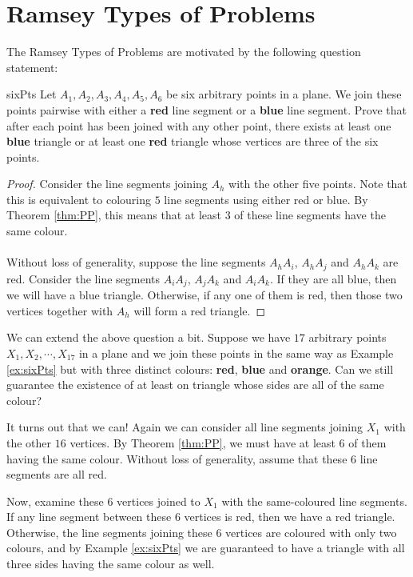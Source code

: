 \documentclass[math]{amznotes}
\theoremstyle{remark}
\begin{document}
\section{Ramsey Types of Problems}
The Ramsey Types of Problems are motivated by the following question statement:
\begin{exbox}{}{sixPts}
    Let $A_1, A_2, A_3, A_4, A_5, A_6$ be six arbitrary points in a plane. We join these points pairwise with either a {\color{red} \textbf{red}} line segment or a {\color{blue} \textbf{blue}} line segment. Prove that after each point has been joined with any other point, there exists at least one {\color{blue} \textbf{blue}} triangle or at least one {\color{red} \textbf{red}} triangle whose vertices are three of the six points.
    \tcblower   
    \begin{proof}
        Consider the line segments joining $A_h$ with the other five points. Note that this is equivalent to colouring $5$ line segments using either red or blue. By Theorem \ref{thm:PP}, this means that at least $3$ of these line segments have the same colour.
        \\\\
        Without loss of generality, suppose the line segments $A_hA_i$, $A_hA_j$ and $A_hA_k$ are red. Consider the line segments $A_iA_j$, $A_jA_k$ and $A_iA_k$. If they are all blue, then we will have a blue triangle. Otherwise, if any one of them is red, then those two vertices together with $A_h$ will form a red triangle.
    \end{proof}
\end{exbox}
We can extend the above question a bit. Suppose we have $17$ arbitrary points $X_1, X_2, \cdots, X_{17}$ in a plane and we join these points in the same way as Example \ref{ex:sixPts} but with three distinct colours: {\color{red} \textbf{red}}, {\color{blue} \textbf{blue}} and {\color{orange} \textbf{orange}}. Can we still guarantee the existence of at least on triangle whose sides are all of the same colour?

It turns out that we can! Again we can consider all line segments joining $X_1$ with the other $16$ vertices. By Theorem \ref{thm:PP}, we must have at least $6$ of them having the same colour. Without loss of generality, assume that these $6$ line segments are all red.

Now, examine these $6$ vertices joined to $X_1$ with the same-coloured line segments. If any line segment between these $6$ vertices is red, then we have a red triangle. Otherwise, the line segments joining these $6$ vertices are coloured with only two colours, and by Example \ref{ex:sixPts} we are guaranteed to have a triangle with all three sides having the same colour as well.
\end{document}
